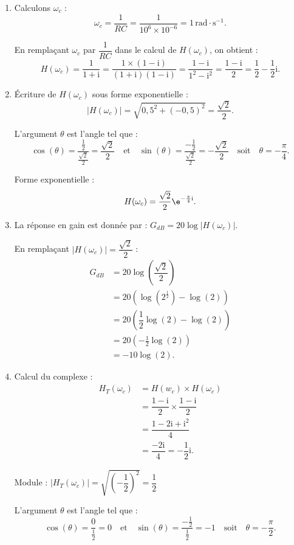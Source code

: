 \bigskip

\begin{enumerate}
\item Calculons $\omega_c$ :
\[\omega_c = \dfrac{1}{R C} = \dfrac{1}{10^{6} \times 10^{-6}} = 1 \, \mathrm{rad \cdot s^{-1}}.\]

En remplaçant $\omega_c$ par $\dfrac{1}{R C}$ dans le calcul de $H(\omega_c)$, on obtient :
\[H(\omega_c) = \dfrac{1}{1 + \text{i}} 
= \dfrac{1 \times (1 - \text{i})}{(1 + \text{i})(1 - \text{i})} 
= \dfrac{1 - \text{i}}{1^2 - \text{i}^2}
= \dfrac{1 - \text{i}}{2}
= \dfrac{1}{2} - \dfrac{1}{2} \text{i}.\]

\item Écriture de $H(\omega_c)$ sous forme exponentielle :
\[|H(\omega_c)| = \sqrt{0,5^2 + (-0,5)^2} = \frac{\sqrt{2}}{2}.\]

L'argument $\theta$ est l'angle tel que :
\[\cos(\theta) = \dfrac{\frac{1}{2}}{\frac{\sqrt{2}}{2}} = \dfrac{\sqrt{2}}{2} \quad \text{et} \quad \sin(\theta) = \dfrac{-\frac{1}{2}}{\frac{\sqrt{2}}{2}} = -\dfrac{\sqrt{2}}{2} \quad \text{soit} \quad \theta = -\dfrac{\pi}{4}.\]

Forme exponentielle :
\[H(\omega_c) = \dfrac{\sqrt{2}}{2} \e^{-\frac{\pi}{4}\text{i}}.\]

\item La réponse en gain est donnée par :
$G_{dB} = 20 \log |H(\omega_c)|.$

En remplaçant $|H(\omega_c)| = \dfrac{\sqrt{2}}{2}$ :
\begin{align*}
G_{dB} &= 20 \log\left(\dfrac{\sqrt{2}}{2}\right) \\
&= 20 \left(\log\left(2^{\frac{1}{2}}\right) - \log(2)\right) \\
&= 20 \left(\dfrac{1}{2}\log(2) - \log(2)\right) \\
&= 20 \left(-\frac{1}{2} \log(2)\right) \\
&= -10 \log(2).
\end{align*}

\item Calcul du complexe :
\begin{align*}
H_T\left(\omega_c\right) &= H\left(w_c\right) \times H\left(\omega_c\right) \\
&= \dfrac{1 - \text{i}}{2} \times \dfrac{1 - \text{i}}{2} \\
&= \dfrac{1 - 2\text{i} + \text{i}^2}{4} \\
&= \dfrac{- 2\text{i}}{4}
= -\dfrac{1}{2}\text{i}.
\end{align*}

Module :
$|H_T\left(\omega_c\right)| = \sqrt{\left(-\dfrac{\text{1}}{2}\right)^2} = \dfrac{1}{2}$

L'argument $\theta$ est l'angle tel que :
\[\cos(\theta) = \dfrac{0}{\frac{1}{2}} = 0 \quad \text{et} \quad \sin(\theta) = \dfrac{-\frac{1}{2}}{\frac{1}{2}} = -1 \quad \text{soit} \quad \theta = -\dfrac{\pi}{2}.\]
\end{enumerate}

\bigskip
